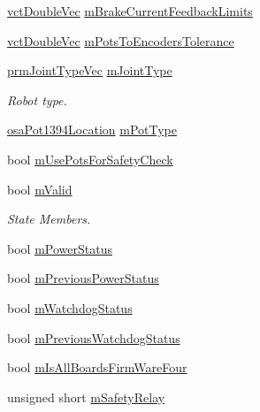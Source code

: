 \begin{DoxyCompactItemize}
\hyperlink{vct_dynamic_vector_types_8h_ade4b3068c86fb88f41af2e5187e491c2}{vct\-Double\-Vec} \hyperlink{classsaw_robot_i_o1394_1_1osa_robot1394_a86f55f72dbbcb54c3b4ba0224590f8bb}{m\-Brake\-Current\-Feedback\-Limits}
\item 
\hyperlink{vct_dynamic_vector_types_8h_ade4b3068c86fb88f41af2e5187e491c2}{vct\-Double\-Vec} \hyperlink{classsaw_robot_i_o1394_1_1osa_robot1394_ae7403c87ba3f27f675f42469e8b1becd}{m\-Pots\-To\-Encoders\-Tolerance}
\item 
\hyperlink{prm_joint_type_8h_a3a21392b4484e2e24aa0b73d553f940e}{prm\-Joint\-Type\-Vec} \hyperlink{classsaw_robot_i_o1394_1_1osa_robot1394_af5829db2fe13eb37578e7bcafce7a3b7}{m\-Joint\-Type}
\begin{DoxyCompactList}\small\item\em Robot type. \end{DoxyCompactList}\item 
\hyperlink{namespacesaw_robot_i_o1394_a9d63d89648f679b6af5cf3f16576bde9}{osa\-Pot1394\-Location} \hyperlink{classsaw_robot_i_o1394_1_1osa_robot1394_a064754c253caef562e4c95429b0ae1ee}{m\-Pot\-Type}
\item 
bool \hyperlink{classsaw_robot_i_o1394_1_1osa_robot1394_a2aeda5f2dad4bc849117833d94dea2fd}{m\-Use\-Pots\-For\-Safety\-Check}
\item 
bool \hyperlink{classsaw_robot_i_o1394_1_1osa_robot1394_acc0bfb2da3fa7f77e29298984da615ec}{m\-Valid}
\begin{DoxyCompactList}\small\item\em State Members. \end{DoxyCompactList}\item 
bool \hyperlink{classsaw_robot_i_o1394_1_1osa_robot1394_aaccb154ac4cf5f274828bd3c8102c823}{m\-Power\-Status}
\item 
bool \hyperlink{classsaw_robot_i_o1394_1_1osa_robot1394_aa988f2c166a0f19e3600343057fef2d2}{m\-Previous\-Power\-Status}
\item 
bool \hyperlink{classsaw_robot_i_o1394_1_1osa_robot1394_a340e3e038049be9906f65234a7489aa3}{m\-Watchdog\-Status}
\item 
bool \hyperlink{classsaw_robot_i_o1394_1_1osa_robot1394_ab525fcd9abd100ef9a2574aaa4381ad5}{m\-Previous\-Watchdog\-Status}
\item 
bool \hyperlink{classsaw_robot_i_o1394_1_1osa_robot1394_ae0a5ea1b2b875284bd8c3e5df038c3e1}{m\-Is\-All\-Boards\-Firm\-Ware\-Four}
\item 
unsigned short \hyperlink{classsaw_robot_i_o1394_1_1osa_robot1394_a550d25317369e34ea8be9006e4494d83}{m\-Safety\-Relay}

\end{DoxyCompactItemize}
